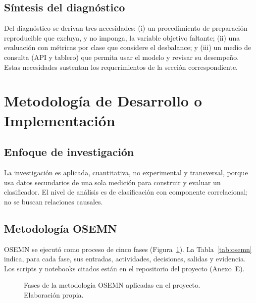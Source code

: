 \subsection{Síntesis del diagnóstico}
Del diagnóstico se derivan tres necesidades: (i) un procedimiento de preparación reproducible que excluya, y no imponga, la variable objetivo faltante; (ii) una evaluación con métricas por clase que considere el desbalance; y (iii) un medio de consulta (API y tablero) que permita usar el modelo y revisar su desempeño. Estas necesidades sustentan los requerimientos de la sección correspondiente.

\section{Metodología de Desarrollo o Implementación}
\subsection{Enfoque de investigación}
La investigación es aplicada, cuantitativa, no experimental y transversal, porque usa datos secundarios de una sola medición para construir y evaluar un clasificador. El nivel de análisis es de clasificación con componente correlacional; no se buscan relaciones causales.

\subsection{Metodología OSEMN}
OSEMN se ejecutó como proceso de cinco fases (Figura~\ref{fig:osemn}). La Tabla~\ref{tab:osemn} indica, para cada fase, sus entradas, actividades, decisiones, salidas y evidencia. Los scripts y notebooks citados están en el repositorio del proyecto (Anexo~E).

\begin{figure}[H]
  \centering
  \caption{Fases de la metodología OSEMN aplicadas en el proyecto. Elaboración propia.}
  \label{fig:osemn}
\end{figure}

